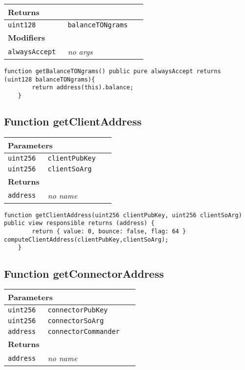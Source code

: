 \ifsoltables
\noindent\begin{tabular}{|l|l|p{5cm}|}\hline
\multicolumn{3}{|l|}{\bf Returns}\\\hline
\tt uint128 & \tt balanceTONgrams &\\\hline
\multicolumn{3}{|l|}{\bf Modifiers}\\\hline
\tt alwaysAccept & {\em no args} &\\\hline
\end{tabular}
\fi

\vspace{2cm}

\begin{lstlisting}[firstnumber=334]
	function getBalanceTONgrams() public pure alwaysAccept returns (uint128 balanceTONgrams){
		return address(this).balance;
	}
\end{lstlisting}

\subsection{Function getClientAddress}


\ifsoltables
\noindent\begin{tabular}{|l|l|p{5cm}|}\hline
\multicolumn{3}{|l|}{\bf Parameters}\\\hline
\tt uint256 & \tt clientPubKey &\\\hline
\tt uint256 & \tt clientSoArg &\\\hline
\multicolumn{3}{|l|}{\bf Returns}\\\hline
\tt address & {\em no name} &\\\hline
\end{tabular}
\fi

\vspace{2cm}

\begin{lstlisting}[firstnumber=118]
	function getClientAddress(uint256 clientPubKey, uint256 clientSoArg) public view responsible returns (address) {
		return { value: 0, bounce: false, flag: 64 } computeClientAddress(clientPubKey,clientSoArg);
	}
\end{lstlisting}

\subsection{Function getConnectorAddress}


\ifsoltables
\noindent\begin{tabular}{|l|l|p{5cm}|}\hline
\multicolumn{3}{|l|}{\bf Parameters}\\\hline
\tt uint256 & \tt connectorPubKey &\\\hline
\tt uint256 & \tt connectorSoArg &\\\hline
\tt address & \tt connectorCommander &\\\hline
\multicolumn{3}{|l|}{\bf Returns}\\\hline
\tt address & {\em no name} &\\\hline
\end{tabular}
\fi

